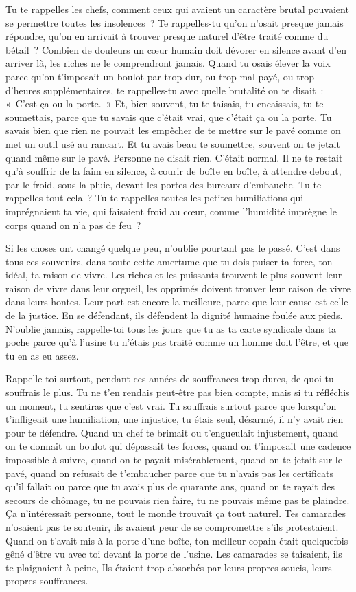 \documentclass[french,twoside]{book} %
\begin{document}
Tu te rappelles les chefs, comment ceux qui avaient un caractère brutal pouvaient se permettre toutes les insolences ? Te rappelles-tu qu'on n'osait presque jamais répondre, qu'on en arrivait à trouver presque naturel d'être traité comme du bétail ? Combien de douleurs un cœur humain doit dévorer en silence avant d'en arriver là, les riches ne le comprendront jamais. Quand tu osais élever la voix parce qu'on t'imposait un boulot par trop dur, ou trop mal payé, ou trop d'heures supplémentaires, te rappelles-tu avec quelle brutalité on te disait : « C'est ça ou la porte. » Et, bien souvent, tu te taisais, tu encaissais, tu te soumettais, parce que tu savais que c'était vrai, que c'était ça ou la porte. Tu savais bien que rien ne pouvait les empêcher de te mettre sur le pavé comme on met un outil usé au rancart. Et tu avais beau te soumettre, souvent on te jetait quand même sur le pavé. Personne ne disait rien. C'était normal. Il ne te restait qu'à souffrir de la faim en silence, à courir de boîte en boîte, à attendre debout, par le froid, sous la pluie, devant les portes des bureaux d'embauche. Tu te rappelles tout cela ? Tu te rappelles toutes les petites humiliations qui imprégnaient ta vie, qui faisaient froid au cœur, comme l'humidité imprègne le corps quand on n'a pas de feu ?\par
Si les choses ont changé quelque peu, n'oublie pourtant pas le passé. C'est dans tous ces souvenirs, dans toute cette amertume que tu dois puiser ta force, ton idéal, ta raison de vivre. Les riches et les puissants trouvent le plus souvent leur raison de vivre dans leur orgueil, les opprimés doivent trouver leur raison de vivre dans leurs hontes. Leur part est encore la meilleure, parce que leur cause est celle de la justice. En se défendant, ils défendent la dignité humaine foulée aux pieds. N'oublie jamais, rappelle-toi tous les jours que tu as ta carte syndicale dans ta poche parce qu'à l'usine tu n'étais pas traité comme un homme doit l'être, et que tu en as eu assez.\par
Rappelle-toi surtout, pendant ces années de souffrances trop dures, de quoi tu souffrais le plus. Tu ne t'en rendais peut-être pas bien compte, mais si tu réfléchis un moment, tu sentiras que c'est vrai. Tu souffrais surtout parce que lorsqu'on t'infligeait une humiliation, une injustice, tu étais seul, désarmé, il n'y avait rien pour te défendre. Quand un chef te brimait ou t'engueulait injustement, quand on te donnait un boulot qui dépassait tes forces, quand on t'imposait une cadence impossible à suivre, quand on te payait misérablement, quand on te jetait sur le pavé, quand on refusait de t'embaucher parce que tu n'avais pas les certificats qu'il fallait ou parce que tu avais plus de quarante ans, quand on te rayait des secours de chômage, tu ne pouvais rien faire, tu ne pouvais même pas te plaindre. Ça n'intéressait personne, tout le monde trouvait ça tout naturel. Tes camarades n'osaient pas te soutenir, ils avaient peur de se compromettre s'ils protestaient. Quand on t'avait mis à la porte d'une boîte, ton meilleur copain était quelquefois gêné d'être vu avec toi devant la porte de l'usine. Les camarades se taisaient, ils te plaignaient à peine, Ils étaient trop absorbés par leurs propres soucis, leurs propres souffrances.\par
\end{document}
